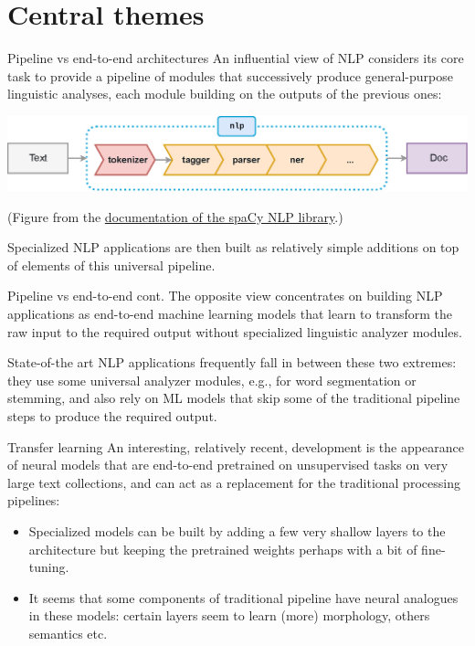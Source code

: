 \documentclass[style=upen, size=14pt]{powerdot}
\newcommand{\gold}{\color{arany}}
\begin{document}
\section{Central themes}

\begin{slide}[toc=Pipeline]{Pipeline vs end-to-end architectures}
  An influential view of NLP considers its core task to provide a {\gold
    pipeline of modules} that successively produce general-purpose linguistic
  analyses, each module building on the outputs of the previous ones: \bigskip

  \includegraphics[width=1.05\textwidth]{figures/pipeline.eps}
  
  \footnotesize{(Figure from the
    \href{https://spacy.io/usage/processing-pipelines}{documentation of the
      spaCy NLP library}.)}\bigskip\pause
  
  \normalsize Specialized NLP applications are then built as relatively simple
  additions on top of elements of this universal pipeline.
\end{slide}

\begin{slide}[toc=End-to-end]{Pipeline vs end-to-end cont.}
  The opposite view concentrates on building NLP applications as {\gold
    end-to-end} machine learning models that learn to transform the raw input to
  the required output without specialized linguistic analyzer modules.\pause

  \bigskip
  
  State-of-the art NLP applications frequently fall in between these two
  extremes: they use some universal analyzer modules, e.g., for word
  segmentation or stemming, and also rely on ML models that skip some of the
  traditional pipeline steps to produce the required output.
\end{slide}

\begin{slide}{Transfer learning}
  An interesting, relatively recent, development is the appearance of neural
  models that are end-to-end pretrained on unsupervised tasks on very large text
  collections, and can act as a replacement for the traditional processing
  pipelines:\pause
  \begin{itemize}
  \item Specialized models can be built by adding a few very shallow layers to
    the architecture but keeping the pretrained weights perhaps with a bit of
    fine-tuning.\pause
  \item It seems that some components of traditional pipeline have neural
    analogues in these models: certain layers seem to learn (more) morphology,
    others semantics etc.\pause
  \end{itemize}
\end{slide}
\end{document}
